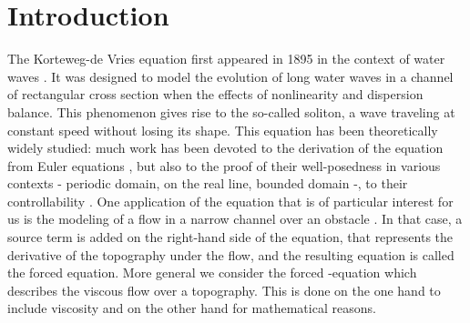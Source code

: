 
\section{Introduction}

The Korteweg-de Vries equation first appeared in 1895 in the context of water waves \cite{korteweg1895xli}. It was designed to model the evolution of long water waves in a channel of rectangular cross section when the effects of nonlinearity and dispersion balance. This phenomenon gives rise to the so-called soliton, a wave traveling at constant speed without losing its shape. This equation has been theoretically widely studied: much work has been devoted to the derivation of the equation from Euler equations \cite{shen1992forced,constantin2008,su2003korteweg}, but also to the proof of their well-posedness in various contexts \cite{miura1976korteweg,kenig1993,bourgain1997periodic} - periodic domain, on the real line, bounded domain -, to their controllability \cite{rosier1997exact,glass2008some,coron2003exact,chapouly2009global}.
One application of the \KdV equation that is of particular interest for us is the modeling of a flow in a narrow channel over an obstacle \cite{milewski2004forced,shen1992forced,shen1996accuracy}. %
In that case, a source term is added on the right-hand side of the \KdV equation, that represents the derivative of the topography under the flow, and the resulting equation is called the forced \KdV equation. More general we consider the forced \KdVB-equation which describes the viscous flow over a topography. This is done on the one hand to include viscosity and on the other hand for mathematical reasons.      %
